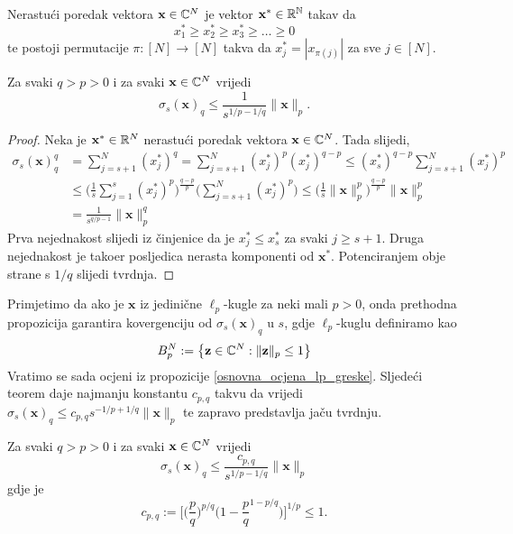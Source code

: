 \documentclass[a4paper,twoside,12pt]{memoir} %
\newcommand{\vect}[1]{\mathbf{#1}}
\renewcommand{\vec}{\vect}
\begin{document}
\begin{defn}
    Nerastu\'ci poredak vektora $\vec{x} \in \C^{N}$ je vektor $\vec{x}^* \in \R^{\N}$ takav da
    $$x^*_1 \geq x^*_2 \geq x^*_3 \geq \dots \geq 0$$
    te postoji permutacije $\pi : [N]\rightarrow[N]$ takva da $x^*_j=|x_{\pi(j)}|$ za sve $j\in [N]$.
\end{defn}
\begin{prop}\label{osnovna_ocjena_lp_greske}
    Za svaki $q > p > 0$ i za svaki $\vec{x}\in \C^{N}$ vrijedi
    $$\sigma_s(\vec{x})_q \leq \frac{1}{s^{1/p - 1/q}}\|\vec{x}\|_p.$$
\end{prop}
\begin{proof}
    Neka je $\vec{x}^* \in \R^N$ nerastu\'ci poredak vektora $\vec{x}\in\C^N$. Tada slijedi,
    \begin{equation*}
    \begin{split} 
        \sigma_s(\vec{x})_q^q &= \sum_{j=s+1}^{N}(x_j^*)^q=\sum_{j=s+1}^{N}(x_j^*)^p(x_j^*)^{q-p} \leq (x_s^*)^{q-p} \sum_{j=s+1}^{N}(x_j^*)^p \\ & \leq \bigg(\frac{1}{s}\sum_{j=1}^{s}(x_j^*)^p\bigg)^{\frac{q-p}{p}}\bigg( \sum_{j=s+1}^N(x_j^*)^p\bigg) \leq \bigg( \frac{1}{s} \|\vec{x}\|_p^p \bigg)^{\frac{q-p}{p}}\|\vec{x}\|_p^p \\ & = \frac{1}{s^{q/p-1}}\|\vec{x}\|_p^q
    \end{split}
    \end{equation*}
    Prva nejednakost slijedi iz \v{c}injenice da je $x_j^* \leq x_s^*$ za svaki $j \geq s+1$. Druga nejednakost je tako\dj er posljedica nerasta komponenti od $\vec{x}^*$. Potenciranjem obje strane s $1/q$ slijedi tvrdnja.
\end{proof}
Primjetimo da ako je $\vec{x}$ iz jedini\v{c}ne $\ell_p$-kugle za neki mali $p>0$, onda prethodna propozicija garantira kovergenciju od $\sigma_s(\vec{x})_q$ u $s$, gdje $\ell_p$-kuglu definiramo kao
$$B_p^N := \big\{ \vec{z} \in \C^N : \|\vec{z}\|_p \leq 1\big\}$$
Vratimo se sada ocjeni iz propozicije \ref{osnovna_ocjena_lp_greske}. Sljede\'ci teorem daje najmanju konstantu $c_{p,q}$ takvu da vrijedi $\sigma_s(\vec{x})_q\leq c_{p,q}s^{-1/p+1/q}\|\vec{x}\|_p$ te zapravo predstavlja ja\v{c}u tvrdnju.
\begin{thm}
    Za svaki $q > p > 0$ i za svaki $\vec{x}\in\C^N$ vrijedi
    \begin{equation*}
    \sigma_s(\vec{x})_q \leq \frac{c_{p,q}}{s^{1/p - 1/q}}\|\vec{x}\|_p
    \end{equation*}
    gdje je
    $$
    c_{p,q} := \bigg[ \bigg(\frac{p}{q}\bigg)^{p/q}\bigg( 1-\frac{p}{q}^{1-p/q}\bigg) \bigg]^{1/p}\leq1.
    $$
\end{thm}
\end{document}
